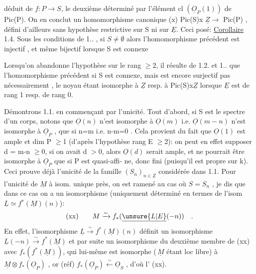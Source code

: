 
déduit de $f:P\longrightarrow S$, le deuxième  déterminé par l'élément  cl $(\underline{O}_P(1))$ de
Pic(P). On en conclut un homomorphisme canonique
(x) \qquad Pic(S)x $\underline{Z} \longrightarrow$ Pic(P)  ,
défini d'ailleurs sans hypothèse restrictive sur S ni sur $\underline{E}$.  Ceci posé:
\uline{Corollaire} 1.4.   Sous les conditions de 1.. , si $S\neq\emptyset$ 
 alors l'homomorphisme précédent est  injectif , et même
bijectif lorsque S est connexe

\placedmargin{[} Lorsqu'on  abandonne l'hypothèse
sur le rang $\geqslant 2$,  il résulte de 1.2. et 1.. que l'homomorphisme précédent
si S est connexe, mais
est encore surjectif  pas nécessairement , le noyau étant
isomorphe 
à $\underline{Z}$  resp. à  Pic(S)x$\underline{Z}$  lorsque  $\underline{E}$  est de rang 1\hand{,} resp. de rang 0.

Démontrons  1.1.  en commençant par l'unicité.  Tout d'abord, si S est
le spectre d'un corps, notons que  $\underline{O}(n)$ n'est isomorphe à $\underline{O}(m)$ i.e.
$\underline{O}(m-n)$  n'est  isomorphe à $\underline{O}_P$ , que si  n=m i.e.  n-m=0 .  Cela provient
du fait que $\underline{O}(1)$ est ample et  dim P $\geqslant$1 (d'après l'hypothèse rang E $\geqslant$2):
on peut en effet supposer  d = m-n $\geqslant$0, si on avait d $>$0, alors $\underline{O}(d)$
serait ample, et ne pourrait être isomorphe à  $\underline{O}_P$ que si P est quasi-affi-%
ne, donc fini (puisqu'il est propre sur k).  Ceci prouve déjà  l'unicité
de la famille $(S_n)_{n\in\underline{Z}}$  considérée dans 1.1.  Pour l'unicité de $\underline{M}$ à isom.
unique près, on est ramené au cas où  $S=S_n$ , je dis que dans ce cas on a
un isomorphisme  (uniquement déterminé en termes de l'isom  $\underline{L} \simeq f$$^*$$(\underline{M})(n)$):
\[ \text{(xx)} \qquad M \xrightarrow{\sim} f_*(\underline{\unsure{L|E}}(-n)) \quad . \]
En effet,  l'isomorphisme  $\underline{L} \xrightarrow{\sim} f^*(\underline{M})(n)$   définit un isomorphisme
$\underline{L}(-n) \xrightarrow{\sim} f^*(\underline{M})$  et par suite un isomorphisme du deuxième membre de (xx)
avec $f_*(f^*(\underline{M}))$, qui lui-même est isomorphe (\,$\underline{M}$ étant loc libre) à
$\underline{M}\otimes f_*(\underline{O}_P)$ , or  (réf)  $f_*(\underline{O}_P) \xleftarrow{\sim} \underline{O}_S$ ,  d'où l' (xx).

